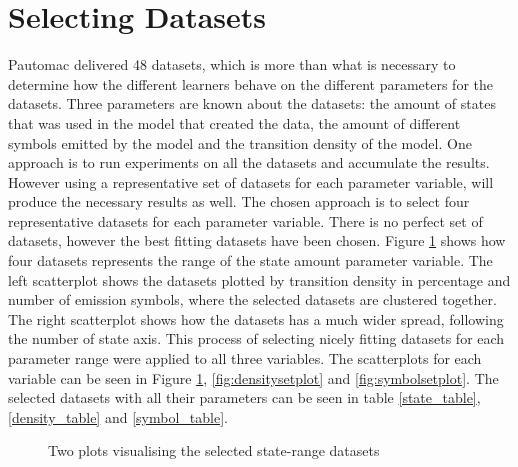 \section{Selecting Datasets}\label{sec:datasets}
Pautomac delivered 48 datasets, which is more than what is necessary to determine how the different learners behave on the different parameters for the datasets. Three parameters are known about the datasets: the amount of states that was used in the model that created the data, the amount of different symbols emitted by the model and the transition density of the model. One approach is to run experiments on all the datasets and accumulate the results. However using a representative set of datasets for each parameter variable, will produce the necessary results as well. The chosen approach is to select four representative datasets for each parameter variable. There is no perfect set of datasets, however the best fitting datasets have been chosen.
Figure \ref{fig:statesetplot} shows how four datasets represents the range of the state amount parameter variable. The left scatterplot shows the datasets plotted by transition density in percentage and number of emission symbols, where the selected datasets are clustered together. The right scatterplot shows how the datasets has a much wider spread, following the number of state axis. This process of selecting nicely fitting datasets for each parameter range were applied to all three variables. The scatterplots for each variable can be seen in Figure \ref{fig:statesetplot}, \ref{fig:densitysetplot} and \ref{fig:symbolsetplot}. The  selected datasets with all their parameters can be seen in table \ref{state_table}, \ref{density_table} and \ref{symbol_table}.

\begin{figure}
	\centering
	\begin{subfigure}[b]{0.5\textwidth}
        \end{subfigure}%
		\begin{subfigure}[b]{0.5\textwidth}
	\end{subfigure}
  	\caption{Two plots visualising the selected state-range datasets}\label{fig:statesetplot}
\end{figure}

